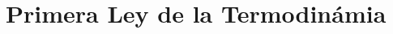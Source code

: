 \begin{enumerate}
\end{enumerate}



\chapter{Primera Ley de la Termodinámia}



































